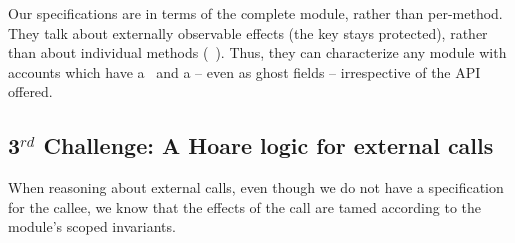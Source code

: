  \noindent
 Our specifications are  in terms of the complete module, rather than per-method.
 They talk about externally observable effects (\eg the key stays protected), 
 rather than about  individual methods (\eg\, ). %
{Thus,  %
  they can characterize  any 
module with  accounts which have a %
 \balance~and a \password -- even as ghost fields --}  irrespective of the API offered.

  
  \subsection{3$^{rd}$ Challenge:  A Hoare logic for external calls} %
 \label{sec:howThird}
 
 When reasoning about external calls, even though we do not have a specification for the callee, we know that the effects of the call are tamed according to the module's scoped invariants. 
% 
%
 
